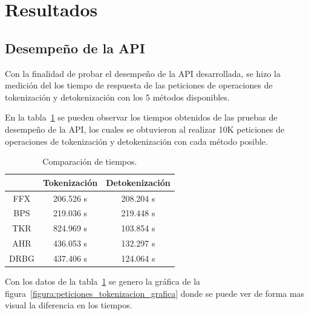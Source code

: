 %
%
%

\section{Resultados}
\label{sec:resultados_api}

\subsection{Desempeño de la API}
\label{sec:comparacion_api}

Con la finalidad de probar el desempeño de la API desarrollada, se hizo la
medición del los tiempo de respuesta de las peticiones de operaciones de
tokenización y detokenización con los 5 métodos disponibles.

En la tabla~\ref{tabla:tiempos_peticiones_tokenizacion} se pueden observar
los tiempos obtenidos de las pruebas de desempeño de la API, los cuales se
obtuvieron al realizar 10K peticiones de operaciones de tokenización y
detokenización con cada método posible.

\begin{table}
  \begin{center}
    \begin{tabular}{c|c|c|}
      \cline{2-3}
      & Tokenización & Detokenización \\
      \hline
      \multicolumn{1}{|c|}{FFX}
        & 206.526 s & 208.204 s \\\hline
      \multicolumn{1}{|c|}{BPS}
        & 219.036 s & 219.448 s \\\hline
      \multicolumn{1}{|c|}{TKR}
        & 824.969 s & 103.854 s \\\hline
      \multicolumn{1}{|c|}{AHR}
        & 436.053 s & 132.297 s \\\hline
      \multicolumn{1}{|c|}{DRBG}
        & 437.406 s & 124.064 s \\\hline
    \end{tabular}
    \caption{Comparación de tiempos.}
    \label{tabla:tiempos_peticiones_tokenizacion}
  \end{center}
\end{table}


Con los datos de la tabla~\ref{tabla:tiempos_peticiones_tokenizacion} se genero
la gráfica de la figura~\ref{figura:peticiones_tokenizacion_grafica} donde se
puede ver de forma mas visual la diferencia en los tiempos.

